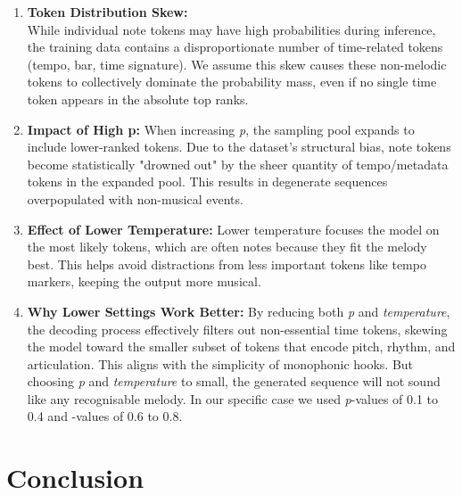 \documentclass[a4paper,12pt]{extarticle}
\begin{document}
\begin{enumerate}
    \item \textbf{Token Distribution Skew:}   \\
    While individual note tokens may have high probabilities during inference, the training data contains a disproportionate number of time-related tokens (tempo, bar, time signature).
    We assume this skew causes these non-melodic tokens to collectively dominate the probability mass, even if no single time token appears in the absolute top ranks.

    \item \textbf{Impact of High p:}  
    When increasing \textit{p}, the sampling pool expands to include lower-ranked tokens. Due to the dataset's structural bias,
    note tokens become statistically "drowned out" by the sheer quantity of tempo/metadata tokens in the expanded pool.
    This results in degenerate sequences overpopulated with non-musical events.

    \item \textbf{Effect of Lower Temperature:}  
    Lower temperature focuses the model on the most likely tokens, which are often notes because they fit the melody best. This helps avoid distractions from less important tokens like tempo markers, keeping the output more musical.

    \item \textbf{Why Lower Settings Work Better:}  
    By reducing both \textit{p} and \textit{temperature}, the decoding process effectively filters out non-essential time tokens, skewing the model toward the smaller subset of tokens that encode pitch, rhythm, and articulation.
    This aligns with the simplicity of monophonic hooks. But choosing \textit{p} and \textit{temperature} to small, the generated sequence will not sound like any recognisable melody.
    In our specific case we used \textit{p}-values of 0.1 to 0.4 and -values of 0.6 to 0.8.
\end{enumerate}

\section{Conclusion}

\printbibliography
\end{document}
